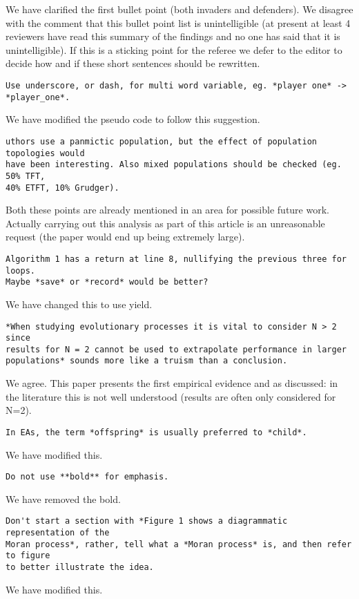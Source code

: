 \documentclass[a4]{article}
\begin{document}
We have clarified the first bullet point (both invaders and defenders). We
disagree with the comment that this bullet point list is unintelligible (at
present at least 4 reviewers have read this summary of the findings and no one
has said that it is unintelligible). If this
is a sticking point for the referee we defer to the editor to decide how and if
these short sentences should be rewritten.

\begin{verbatim}
Use underscore, or dash, for multi word variable, eg. *player one* ->
*player_one*.
\end{verbatim}

We have modified the pseudo code to follow this suggestion.

\begin{verbatim}
uthors use a panmictic population, but the effect of population topologies would
have been interesting. Also mixed populations should be checked (eg. 50% TFT,
40% ETFT, 10% Grudger).
\end{verbatim}

Both these points are already mentioned in an area for possible future work.
Actually carrying out this analysis as part of this article is an unreasonable
request (the paper would end up being extremely large).

\begin{verbatim}
Algorithm 1 has a return at line 8, nullifying the previous three for loops.
Maybe *save* or *record* would be better?
\end{verbatim}

We have changed this to use yield.

\begin{verbatim}
*When studying evolutionary processes it is vital to consider N > 2 since
results for N = 2 cannot be used to extrapolate performance in larger
populations* sounds more like a truism than a conclusion.
\end{verbatim}

We agree. This paper presents the first empirical evidence and as discussed: in
the literature this is not well understood (results are often only considered
for N=2).

\begin{verbatim}
In EAs, the term *offspring* is usually preferred to *child*.
\end{verbatim}

We have modified this.

\begin{verbatim}
Do not use **bold** for emphasis.
\end{verbatim}

We have removed the bold.

\begin{verbatim}
Don't start a section with *Figure 1 shows a diagrammatic representation of the
Moran process*, rather, tell what a *Moran process* is, and then refer to figure
to better illustrate the idea.
\end{verbatim}

We have modified this.
\end{document}
